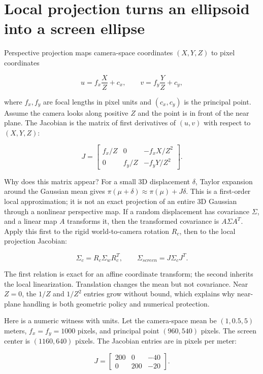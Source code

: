 \section{Local projection turns an ellipsoid into a screen ellipse}\label{04-visual-computing-ii-ch037-local-projection-turns-an-ellipsoid-into-a-screen-ellipse}

Perspective projection maps camera-space coordinates \((X,Y,Z)\) to pixel coordinates

\[
u=f_x\frac XZ+c_x,\qquad v=f_y\frac YZ+c_y,
\]

where \(f_x,f_y\) are focal lengths in pixel units and \((c_x,c_y)\) is the principal point. Assume the camera looks along positive \(Z\) and the point is in front of the near plane. The Jacobian is the matrix of first derivatives of \((u,v)\) with respect to \((X,Y,Z)\):

\[
J=\begin{bmatrix}
f_x/Z&0&-f_xX/Z^2\\
0&f_y/Z&-f_yY/Z^2
\end{bmatrix}.
\]

Why does this matrix appear? For a small 3D displacement \(\delta\), Taylor expansion around the Gaussian mean gives \(\pi(\mu+\delta)\approx\pi(\mu)+J\delta\). This is a first-order local approximation; it is not an exact projection of an entire 3D Gaussian through a nonlinear perspective map. If a random displacement has covariance \(\Sigma\), and a linear map \(A\) transforms it, then the transformed covariance is \(A\Sigma A^T\). Apply this first to the rigid world-to-camera rotation \(R_c\), then to the local projection Jacobian:

\[
\Sigma_c=R_c\Sigma_wR_c^T,
\qquad
\Sigma_{screen}=J\Sigma_cJ^T.
\]

The first relation is exact for an affine coordinate transform; the second inherits the local linearization. Translation changes the mean but not covariance. Near \(Z=0\), the \(1/Z\) and \(1/Z^2\) entries grow without bound, which explains why near-plane handling is both geometric policy and numerical protection.

Here is a numeric witness with units. Let the camera-space mean be \((1,0.5,5)\) meters, \(f_x=f_y=1000\) pixels, and principal point \((960,540)\) pixels. The screen center is \((1160,640)\) pixels. The Jacobian entries are in pixels per meter:

\[
J=\begin{bmatrix}200&0&-40\\0&200&-20\end{bmatrix}.
\]

